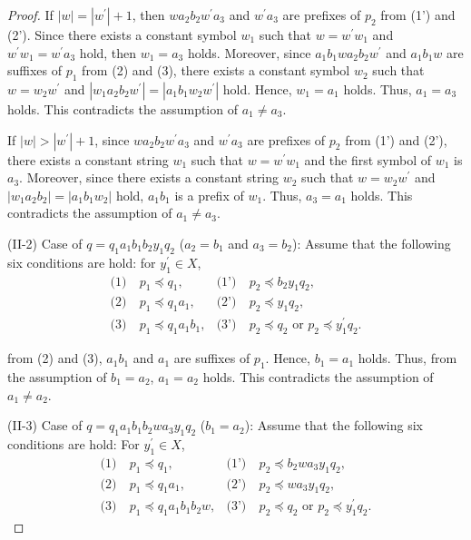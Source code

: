 \begin{proof}
If $|w|=|w^{\prime}|+1$, then $wa_{2}b_{2}w^{\prime}a_{3}$ and $w^{\prime}a_{3}$ are prefixes of $p_{2}$ from (1') and (2').
Since there exists a constant symbol $w_{1}$ such that $w=w^{\prime}w_{1}$ and $w^{\prime}w_{1}=w^{\prime}a_{3}$ hold, then $w_{1}=a_{3}$ holds.
Moreover, since $a_{1}b_{1}wa_{2}b_{2}w^{\prime}$ and $a_{1}b_{1}w$ are suffixes of $p_{1}$ from (2) and (3), 
there exists a constant symbol $w_{2}$ such that $w=w_{2}w^{\prime}$ and $|w_{1}a_{2}b_{2}w^{\prime}|=|a_{1}b_{1}w_{2}w^{\prime}|$ hold.
Hence, $w_{1}=a_{1}$ holds.
Thus, $a_{1}=a_{3}$ holds.
This contradicts the assumption of $a_{1}\ne a_{3}$.

If $|w| > |w^{\prime}|+1$, since $wa_{2}b_{2}w^{\prime}a_{3}$ and $w^{\prime}a_{3}$ are prefixes of $p_{2}$ from (1') and (2'),
there exists a constant string $w_{1}$ such that $w=w^{\prime}w_{1}$ and the first symbol of $w_{1}$ is $a_{3}$.
Moreover, since there exists a constant string $w_{2}$ such that $w=w_{2}w^{\prime}$ and $|w_{1}a_{2}b_{2}|=|a_{1}b_{1}w_{2}|$ hold,
$a_{1}b_{1}$ is a prefix of $w_{1}$.
Thus, $a_{3}=a_{1}$ holds.
This contradicts the assumption of $a_{1} \ne a_{3}$.
\smallskip

\noindent
(II-2) Case of $q=q_{1}a_{1}b_{1}b_{2}y_{1}q_{2}$ ($a_{2}=b_{1}$ and $a_{3}=b_{2}$):
Assume that the following six conditions are hold: for $y_{1}^{\prime} \in X$,
\begin{align*}
\textrm{(1)}~& p_{1} \preceq q_{1}, & \textrm{(1')}~& p_{2} \preceq b_{2}y_{1}q_{2}, \\
\textrm{(2)}~& p_{1} \preceq q_{1}a_{1}, & \textrm{(2')}~& p_{2} \preceq y_{1}q_{2}, \\
\textrm{(3)}~& p_{1} \preceq q_{1}a_{1}b_{1}, & \textrm{(3')}~& p_{2} \preceq q_{2} \mbox{~or~} p_{2} \preceq y_{1}^{\prime}q_{2}.
\end{align*}

\noindent
from (2) and (3), $a_{1}b_{1}$ and $a_{1}$ are suffixes of $p_{1}$.
Hence, $b_{1}=a_{1}$ holds.
Thus, from the assumption of $b_{1}=a_{2}$, $a_{1}=a_{2}$ holds.
This contradicts the assumption of $a_{1} \ne a_{2}$.
\smallskip

\noindent
(II-3) Case of $q=q_{1}a_{1}b_{1}b_{2}wa_{3}y_{1}q_{2}$ ($b_{1}=a_{2}$):
Assume that the following six conditions are hold: For $y_{1}^{\prime} \in X$,
\begin{align*}
\textrm{(1)}~& p_{1} \preceq q_{1}, & \textrm{(1')}~& p_{2} \preceq b_{2}wa_{3}y_{1}q_{2}, \\
\textrm{(2)}~& p_{1} \preceq q_{1}a_{1}, & \textrm{(2')}~& p_{2} \preceq wa_{3}y_{1}q_{2}, \\
\textrm{(3)}~& p_{1} \preceq q_{1}a_{1}b_{1}b_{2}w, & \textrm{(3')}~& p_{2} \preceq q_{2} \mbox{~or~} p_{2} \preceq y_{1}^{\prime}q_{2}.
\end{align*}


\end{proof}
